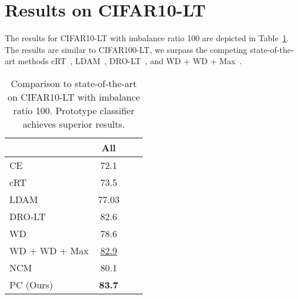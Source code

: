 \documentclass{article}
\begin{document}
\section{Results on CIFAR10-LT}
The results for CIFAR10-LT with imbalance ratio 100 are depicted in Table~\ref{tab:table 9}. The results are similar to CIFAR100-LT, we surpass the competing state-of-the-art methods cRT~\cite{kang2019decoupling}, LDAM~\cite{cao2019learning}, DRO-LT~\cite{samuel2021distributional}, and WD + WD + Max~\cite{alshammari2022long}. 

\begin{table}[h!]
  \centering
  \begin{tabular}{l c c c}
    \toprule
      & All \\
    \midrule
    CE & 72.1 \\
    cRT & 73.5 \\
    LDAM & 77.03 \\
    DRO-LT & 82.6 \\
    WD & 78.6 \\
    WD + WD + Max & \underline{82.9} \\
    \midrule
    NCM & 80.1 \\
    PC (Ours) & \textbf{83.7} \\
    \bottomrule
  \end{tabular}
   \caption{Comparison to state-of-the-art on CIFAR10-LT with imbalance ratio 100. Prototype classifier achieves superior results.}
  \label{tab:table 9}
\end{table}
\end{document}
